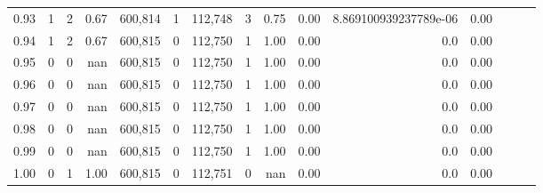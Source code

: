 \begin{tabular}{rrrrrrrrrrrrrrr}
0.93 &       1 &      2 &  0.67 &  600,814 &        1 &  112,748 &        3 &  0.75 &  0.00 &   8.869100939237789e-06 &      0.00 \\
0.94 &       1 &      2 &  0.67 &  600,815 &        0 &  112,750 &        1 &  1.00 &  0.00 &                     0.0 &      0.00 \\
0.95 &       0 &      0 &   nan &  600,815 &        0 &  112,750 &        1 &  1.00 &  0.00 &                     0.0 &      0.00 \\
0.96 &       0 &      0 &   nan &  600,815 &        0 &  112,750 &        1 &  1.00 &  0.00 &                     0.0 &      0.00 \\
0.97 &       0 &      0 &   nan &  600,815 &        0 &  112,750 &        1 &  1.00 &  0.00 &                     0.0 &      0.00 \\
0.98 &       0 &      0 &   nan &  600,815 &        0 &  112,750 &        1 &  1.00 &  0.00 &                     0.0 &      0.00 \\
0.99 &       0 &      0 &   nan &  600,815 &        0 &  112,750 &        1 &  1.00 &  0.00 &                     0.0 &      0.00 \\
1.00 &       0 &      1 &  1.00 &  600,815 &        0 &  112,751 &        0 &   nan &  0.00 &                     0.0 &      0.00 \\
\bottomrule
\end{tabular}

